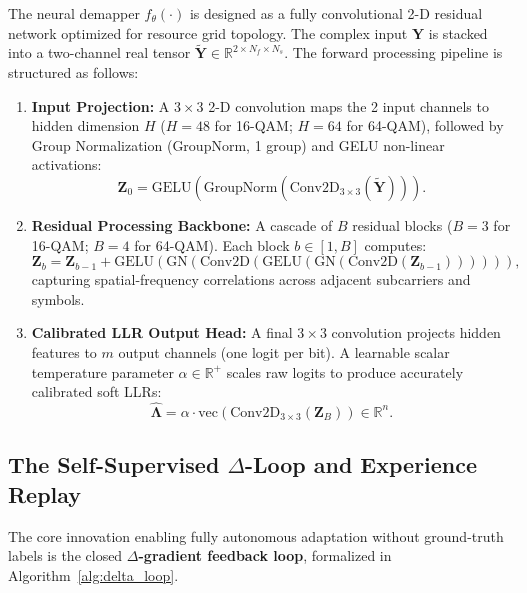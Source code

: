 ﻿\documentclass[journal,twoside]{IEEEtran}
\begin{document}
The neural demapper $f_\theta(\cdot)$ is designed as a fully convolutional 2-D residual
network optimized for resource grid topology.
The complex input $\mathbf{Y}$ is stacked into a two-channel real tensor
$\tilde{\mathbf{Y}} \in \mathbb{R}^{2 \times N_f \times N_s}$.
The forward processing pipeline is structured as follows:
\begin{enumerate}
    \item \textbf{Input Projection:} A $3 \times 3$ 2-D convolution maps the 2 input channels
    to hidden dimension $H$ ($H=48$ for 16-QAM; $H=64$ for 64-QAM), followed by Group Normalization
    (GroupNorm, 1 group) and GELU non-linear activations:
    \begin{equation}
      \mathbf{Z}_0 = \text{GELU}(\text{GroupNorm}(\text{Conv2D}_{3\times3}(\tilde{\mathbf{Y}}))).
    \end{equation}
    \item \textbf{Residual Processing Backbone:} A cascade of $B$ residual blocks ($B=3$ for 16-QAM;
    $B=4$ for 64-QAM). Each block $b \in [1, B]$ computes:
    \begin{equation}
      \mathbf{Z}_b = \mathbf{Z}_{b-1} + \text{GELU}(\text{GN}(\text{Conv2D}(\text{GELU}(\text{GN}(\text{Conv2D}(\mathbf{Z}_{b-1})))))),
    \end{equation}
    capturing spatial-frequency correlations across adjacent subcarriers and symbols.
    \item \textbf{Calibrated LLR Output Head:} A final $3 \times 3$ convolution projects hidden
    features to $m$ output channels (one logit per bit). A learnable scalar temperature parameter
    $\alpha \in \mathbb{R}^+$ scales raw logits to produce accurately calibrated soft LLRs:
    \begin{equation}
      \hat{\bm{\Lambda}} = \alpha \cdot \text{vec}\left(\text{Conv2D}_{3\times3}(\mathbf{Z}_B)\right) \in \mathbb{R}^n.
    \end{equation}
\end{enumerate}

\subsection{The Self-Supervised $\Delta$-Loop and Experience Replay}

The core innovation enabling fully autonomous adaptation without ground-truth labels is the
closed \textbf{$\Delta$-gradient feedback loop}, formalized in Algorithm~\ref{alg:delta_loop}.
\end{document}
